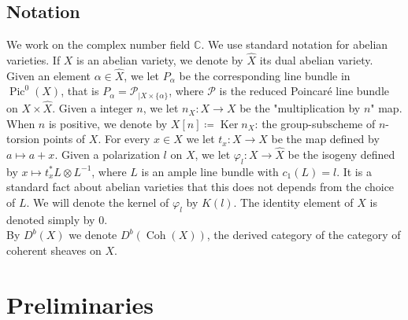 \documentclass[11pt,letter]{amsart}
\numberwithin{equation}{section}
\begin{document}
\subsection*{Notation}
We work on the complex number field $\mathbb{C}$. We use standard notation for abelian varieties. If $X$ is an abelian variety, we denote by $\hat{X}$ its dual abelian variety. Given an element $\alpha\in\hat{X}$, we let $P_\alpha$ be the corresponding line bundle in $\operatorname{Pic}^0(X)$, that is 
$P_\alpha=\mathscr{P}_{|X\times\{\alpha\}}$, where $\mathscr{P}$ is the reduced Poincar\'e line bundle on $X\times \hat X$. Given a integer $n$, we let $n_X:X\rightarrow X$ be the "multiplication by $n$" map. When $n$ is positive, we denote by $X[n]\coloneqq \operatorname{Ker}n_X$: the group-subscheme of $n$-torsion points of $X$. For every $x\in X$ we let $t_x:X\rightarrow X$ be the map defined by $a\mapsto a+x$. Given a polarization $l$ on $X$, we let $\varphi_l:X\rightarrow \hat{X}$ be the isogeny defined by $x\mapsto t_x^*L\otimes L^{-1}$, where $L$ is an ample line bundle with $c_1(L)=l$. It is a standard fact about abelian varieties that this does not depends from the choice of $L$. We will denote the  kernel of $\varphi_l$ by $K(l)$. The identity element of $X$ is denoted simply by 0.\\ By $D^b(X)$ we denote $D^b(\operatorname{Coh}(X))$, the derived category of the category of coherent sheaves on $X$.

\section{Preliminaries}\label{sec2}
\end{document}
